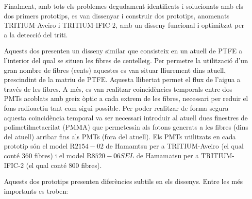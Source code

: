 Finalment, amb tots els problemes degudament identificats i solucionats amb els dos primers prototips, es van dissenyar i construir dos prototips, anomenats TRITIUM-Aveiro i TRITIUM-IFIC-2, amb un disseny funcional i optimitzat per a la detecció del triti. 

Aquests dos presenten un disseny similar que consisteix en un atuell de PTFE a l'interior del qual se situen les fibres de centelleig. Per permetre la utilització d'un gran nombre de fibres (cents) aquestes es van situar lliurement dins atuell, prescindint de la matriu de PTFE. Aquesta llibertat permet el flux de l'aigua a través de les fibres. A més, es van realitzar coincidències temporals entre dos PMTs acoblats amb greix òptic a cada extrem de les fibres, necessari per reduir el fons radioactiu tant com sigui possible. Per poder realitzar de forma segura aquesta coincidència temporal va ser necessari introduir al atuell dues finestres de polimetilmetacrilat (PMMA) que permetessin als fotons generats a les fibres (dins del atuell) arribar fins als PMTs (fora del atuell). Els PMTs utilitzats en cada prototip són el model R$2154-02$ de Hamamtsu \cite{DataSheetPMTsAveiro} per a TRITIUM-Aveiro (el qual conté 360 fibres) i el model R$8520-06SEL$ de Hamamatsu \cite{DataSheetPMTs} per a TRITIUM-IFIC-2 (el qual conté 800 fibres).

Aquests dos prototips presenten diferències subtils en els dissenys. Entre les més importants es troben:

